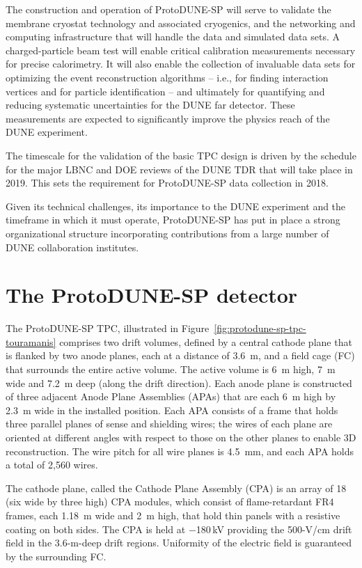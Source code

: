 The construction and operation of ProtoDUNE-SP will serve to validate the membrane cryostat technology and associated cryogenics, and the networking and computing infrastructure that will handle the data and simulated data sets.
A charged-particle beam test will enable critical calibration measurements necessary for precise calorimetry. It will also enable the collection of invaluable data sets for optimizing the event reconstruction algorithms -- i.e., for finding interaction vertices and for particle identification -- and ultimately for quantifying and reducing systematic uncertainties for the DUNE far detector. These measurements are expected to significantly improve the physics reach of the DUNE experiment.

The timescale for the validation of the basic TPC design is driven by the schedule for the major LBNC and DOE reviews of the DUNE TDR that will take place in 2019. This sets the requirement for ProtoDUNE-SP data collection in 2018. 

Given its technical challenges, its importance to the DUNE experiment and the timeframe in which it must operate, ProtoDUNE-SP has put in place a strong organizational structure incorporating 
contributions from a large number of DUNE collaboration institutes. 

\section{The ProtoDUNE-SP detector}
\label{intro:detector}

The ProtoDUNE-SP TPC, illustrated in Figure~\ref{fig:protodune-sp-tpc-touramanis} comprises two drift volumes, defined by  a central cathode plane that is flanked by two anode planes, each at a distance of 3.6~m, and a field cage (FC) that surrounds the entire active volume. The active volume is 6~m high, 7~m wide and 7.2~m deep (along the drift direction).
Each anode plane is constructed of three adjacent Anode Plane Assemblies (APAs) that are each 6~m high by 2.3~m wide in the installed position. Each APA consists of a frame that holds three parallel planes of sense and shielding wires; the wires of each plane are
oriented at different angles with respect to those on the other planes to enable 3D reconstruction.  The wire pitch for all wire planes is 4.5~mm, and each APA holds a total of 2,560 wires. 

The cathode plane, called the Cathode Plane Assembly (CPA) is an array of 18 (six wide by three high) CPA modules, which consist of  flame-retardant FR4 frames, each 1.18~m wide and 2~m high, that hold thin panels with a resistive coating on both sides. 
The CPA is held at $-$180\,kV providing the 500-V/cm drift field in the 3.6-m-deep drift regions. 
Uniformity of the electric field is guaranteed by the surrounding FC.
 
